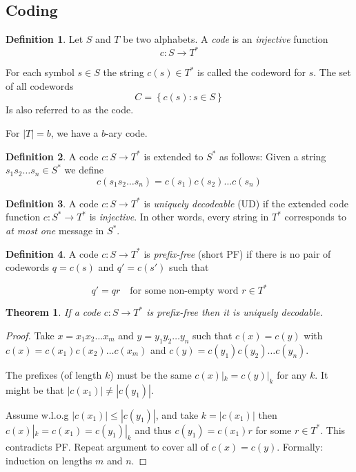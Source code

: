 \documentclass[a4paper]{article}
\newtheorem{theorem}{Theorem}
\theoremstyle{definition} \newtheorem*{definition}{Definition}
\begin{document}
\subsection{Coding}
\begin{definition}
  Let $S$ and $T$ be two alphabets. A \emph{code} is an \emph{injective}
  function 
  \[
    c : S \rightarrow T^*
  \]

  For each symbol $s \in S$ the string $c(s) \in T^*$ is called the 
  codeword for $s$. The set of all codewords
  \[
    C = \left\{ c(s) : s \in S \right\}
  \]
  Is also referred to as the code.
\end{definition}

\begin{remark}
  For $|T|=b$, we have a $b$-ary code.
\end{remark}

\begin{definition}
  A code $c : S \rightarrow T^*$ is extended to  $S^*$ as follows: Given
  a string $s_1s_2 \dots s_n \in S^*$ we define
  \[
    c(s_1s_2 \dots s_n) = c(s_1)c(s_2)\dots c(s_n)
  \]
\end{definition}

\begin{definition}
  A code $c : S \rightarrow T^*$ is \emph{uniquely decodeable} (UD) if the
  extended code function $c : S^{*} \rightarrow T^*$ is \emph{injective}.
  In other words, every string in $T^*$ corresponds to \emph{at most one} 
  message in $S^*$.
\end{definition}

\begin{definition}
  A code $c : S \rightarrow T^*$ is \emph{prefix-free} (short PF) if there
  is no pair of codewords $q = c(s)$ and $q' = c(s')$ such that

  \[
    q' = qr  \quad \text{for some non-empty word } r \in T^*
  \]

\end{definition}

\begin{theorem}
    If a code $c : S \rightarrow T^*$ is prefix-free then it is uniquely decodable.
    \label{thm:pfimpliesud}
\end{theorem}

\begin{proof}
  Take $x = x_1 x_2 \dots x_m$ and $y = y_1 y_2 \dots y_n$ such that $c(x)=c(y)$
  with $c(x)=c(x_1)c(x_2)\dots c(x_m)$ and $c(y)=c(y_1)c(y_2)\dots c(y_n)$.
  
  The prefixes (of length $k$)  must be the same $c(x)|_k = c(y)|_k$ for any $k$.
  It might be that $|c(x_1)|\neq |c(y_1)|$.

  Assume w.l.o.g $|c(x_1)| \leq |c(y_1)|$, and take $k = |c(x_1)|$ then 
  $c(x)|_k = c(x_1) = c(y_1)|_k$ and thus $c(y_1)=c(x_1)r$ for some $r \in T^*$.
  This contradicts PF. Repeat argument to cover all of $c(x)=c(y)$. Formally:
  induction on lengths $m$ and $n$.
\end{proof}
\end{document}
